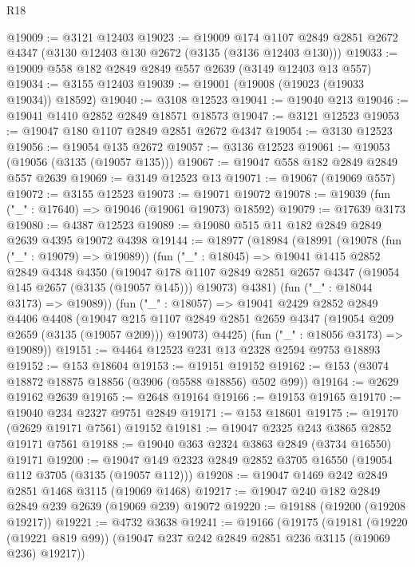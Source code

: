 \begin{lexlean}{R18}
\begin{coremodule}
@19009 := @3121 @12403
@19023 := @19009
    @174
    @1107
    @2849
    @2851
    @2672
    @4347
    (@3130 @12403 @130 @2672 (@3135 (@3136 @12403 @130)))
@19033 := @19009 @558 @182 @2849 @2849 @557 @2639 (@3149 @12403 @13 @557)
@19034 := @3155 @12403
@19039 := @19001 (@19008 (@19023 (@19033 @19034)) @18592)
@19040 := @3108 @12523
@19041 := @19040 @213
@19046 := @19041 @1410 @2852 @2849 @18571 @18573
@19047 := @3121 @12523
@19053 := @19047 @180 @1107 @2849 @2851 @2672 @4347
@19054 := @3130 @12523
@19056 := @19054 @135 @2672
@19057 := @3136 @12523
@19061 := @19053 (@19056 (@3135 (@19057 @135)))
@19067 := @19047 @558 @182 @2849 @2849 @557 @2639
@19069 := @3149 @12523 @13
@19071 := @19067 (@19069 @557)
@19072 := @3155 @12523
@19073 := @19071 @19072
@19078 := @19039 (fun ("_" : @17640) => @19046 (@19061 @19073) @18592)
@19079 := @17639 @3173
@19080 := @4387 @12523
@19089 := @19080 @515 @11 @182 @2849 @2849 @2639 @4395 @19072 @4398
@19144 := @18977
    (@18984
      (@18991
        (@19078 (fun ("_" : @19079) => @19089))
        (fun ("_" : @18045) =>
        @19041
          @1415
          @2852
          @2849
          @4348
          @4350
          (@19047
            @178
            @1107
            @2849
            @2851
            @2657
            @4347
            (@19054 @145 @2657 (@3135 (@19057 @145)))
            @19073)
          @4381)
        (fun ("_" : @18044 @3173) => @19089))
      (fun ("_" : @18057) =>
      @19041
        @2429
        @2852
        @2849
        @4406
        @4408
        (@19047 @215 @1107 @2849 @2851 @2659 @4347 (@19054 @209 @2659 (@3135 (@19057 @209))) @19073)
        @4425)
      (fun ("_" : @18056 @3173) => @19089))
@19151 := @4464 @12523 @231 @13 @2328 @2594 @9753 @18893
@19152 := @153 @18604
@19153 := @19151 @19152
@19162 := @153 (@3074 @18872 @18875 @18856 (@3906 (@5588 @18856) @502 @99))
@19164 := @2629 @19162 @2639
@19165 := @2648 @19164
@19166 := @19153 @19165
@19170 := @19040 @234 @2327 @9751 @2849
@19171 := @153 @18601
@19175 := @19170 (@2629 @19171 @7561) @19152
@19181 := @19047 @2325 @243 @3865 @2852 @19171 @7561
@19188 := @19040 @363 @2324 @3863 @2849 (@3734 @16550) @19171
@19200 := @19047 @149 @2323 @2849 @2852 @3705 @16550 (@19054 @112 @3705 (@3135 (@19057 @112)))
@19208 := @19047 @1469 @242 @2849 @2851 @1468 @3115 (@19069 @1468)
@19217 := @19047 @240 @182 @2849 @2849 @239 @2639 (@19069 @239) @19072
@19220 := @19188 (@19200 (@19208 @19217))
@19221 := @4732 @3638
@19241 := @19166
    (@19175
      (@19181
        (@19220 (@19221 @819 @99))
        (@19047 @237 @242 @2849 @2851 @236 @3115 (@19069 @236) @19217))

\end{coremodule}
\end{lexlean}
